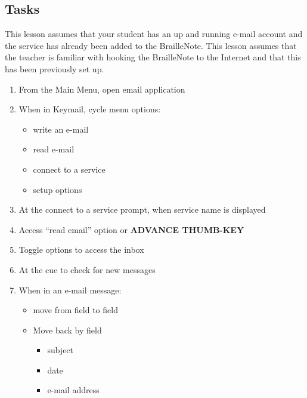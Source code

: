 \documentclass[10pt,letterpaper,twoside]{report}
\begin{document}
{{{\subsection{Tasks}
This lesson assumes that your student has an up and running e-mail account and the service has already been added to the BrailleNote. This lesson assumes that the teacher is familiar with hooking the BrailleNote to the Internet and that this has been previously set up.
\begin{enumerate}
	\item From the Main Menu, open email application  
	\item When in Keymail, cycle menu options:   
	    \begin{itemize}
	        \item write an e-mail
	        \item read e-mail
	        \item connect to a service
	        \item setup options
	   \end{itemize}
	\item At the connect to a service prompt, when service name is displayed  
	\item Access ``read email'' option   or {\textcolor{accent}{\MakeUppercase{\textbf{advance thumb-key}}}}
	\item Toggle options to access the inbox   
	\item At the cue to check for new messages  
	\item When in an e-mail message:
	    \begin{itemize}
	        \item move from field to field  
	        \item Move back by field    
	        \begin{itemize}
	            \item subject
	            \item date
	            \item e-mail address

\end{itemize}
\end{itemize}
\end{enumerate}}}}
\end{document}

